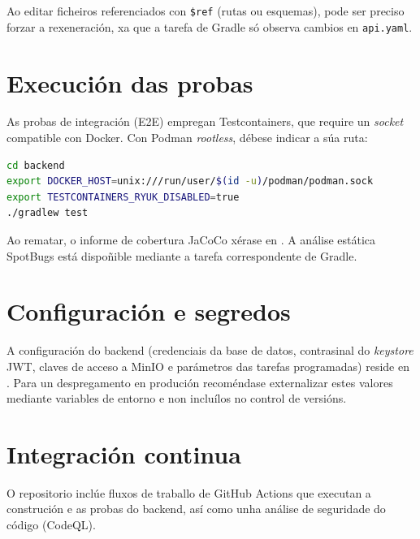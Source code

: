\noindent Ao editar ficheiros referenciados con \texttt{\$ref} (rutas ou esquemas), pode
ser preciso forzar a rexeneración, xa que a tarefa de Gradle só observa cambios en
\texttt{api.yaml}.

\section{Execución das probas}

As probas de integración (E2E) empregan Testcontainers, que require un \textit{socket}
compatible con Docker. Con Podman \textit{rootless}, débese indicar a súa ruta:

\begin{lstlisting}[language=bash]
cd backend
export DOCKER_HOST=unix:///run/user/$(id -u)/podman/podman.sock
export TESTCONTAINERS_RYUK_DISABLED=true
./gradlew test
\end{lstlisting}

\noindent Ao rematar, o informe de cobertura JaCoCo xérase en
. A análise estática SpotBugs
está dispoñible mediante a tarefa correspondente de Gradle.

\section{Configuración e segredos}

A configuración do backend (credenciais da base de datos, contrasinal do \textit{keystore}
JWT, claves de acceso a MinIO e parámetros das tarefas programadas) reside en
. Para un despregamento en produción recoméndase externalizar
estes valores mediante variables de entorno e non incluílos no control de versións.

\section{Integración continua}

O repositorio inclúe fluxos de traballo de GitHub Actions que executan a construción e as
probas do backend, así como unha análise de seguridade do código (CodeQL).
